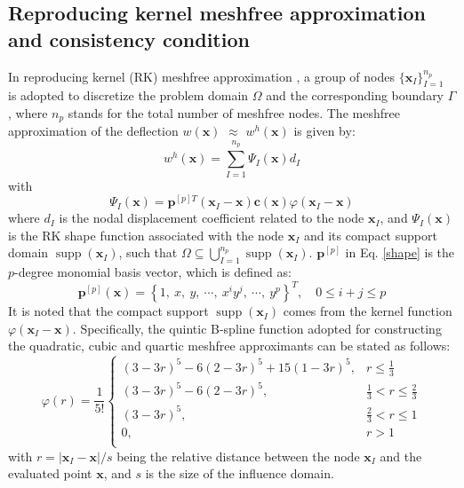 \subsection{Reproducing kernel meshfree approximation and consistency condition}\label{sec:mls}

In reproducing kernel (RK) meshfree approximation \cite{}, a group of nodes $\{\boldsymbol x_I\}_{I=1}^{n_p}$ is adopted to discretize the problem domain $\Omega$ and the corresponding boundary $\Gamma$, where $n_p$ stands for the total number of meshfree nodes.
The meshfree approximation of the deflection $w(\boldsymbol x)$ $\approx$ $w^{h}(\boldsymbol x)$ is given by:
\begin{equation}\label{approx}
	w^{h}(\boldsymbol x)=\sum_{I=1}^{n_p}\Psi_I(\boldsymbol x) d_I
\end{equation}
with
\begin{equation}\label{shape}
	\Psi_I(\boldsymbol x)=\boldsymbol p^{[p]T}(\boldsymbol x_I-\boldsymbol x) \boldsymbol c(\boldsymbol x) \varphi(\boldsymbol x_I-\boldsymbol x)
\end{equation}
where $d_I$ is the nodal displacement coefficient related to the node $\boldsymbol x_I$, and $\Psi_I(\boldsymbol x)$ is the RK shape function associated with the node $\boldsymbol x_I$ and its compact support domain $\operatorname{supp}(\boldsymbol x_I)$, such that $\Omega\subseteq\bigcup_{I=1}^{n_p}\operatorname{supp}(\boldsymbol x_I)$.
$\boldsymbol p^{[p]}$ in Eq. \eqref{shape} is the $p$-degree monomial basis vector, which is defined as:
\begin{equation}\label{monomial}
	\boldsymbol p^{[p]}(\boldsymbol x)=\left\{1,\ x,\ y,\ \cdots,\ x^{i}y^{j},\ \cdots,\ y^{p}\right\}^{T},\quad 0\le i+j\le p
\end{equation}
It is noted that the compact support $\operatorname{supp}(\boldsymbol x_I)$ comes from the kernel function $\varphi(\boldsymbol x_I-\boldsymbol x)$.
Specifically, the quintic B-spline function \cite{} adopted for constructing the quadratic, cubic and quartic meshfree approximants can be stated as follows:
\begin{equation}\label{kernel}
	\varphi(r)=\frac{1}{5!}\begin{cases}
		(3-3r)^5 - 6(2-3r)^5 + 15(1-3r)^5, & r\le \frac{1}{3} \\
		(3-3r)^5 - 6(2-3r)^5, & \frac{1}{3} < r\le \frac{2}{3} \\
		(3-3r)^5, & \frac{2}{3} < r\le 1 \\
		0, & r> 1 \\
	\end{cases}
\end{equation}
with $r=|\boldsymbol x_I-\boldsymbol x|/s$ being the relative distance between the node $\boldsymbol x_I$ and the evaluated point $\boldsymbol x$, and $s$ is the size of the influence domain.

